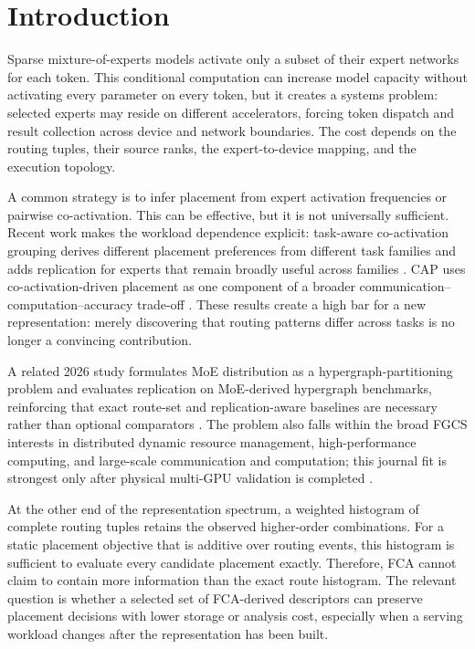 \documentclass[a4paper,preprint,review,12pt,authoryear]{elsarticle}
\begin{document}
\section{Introduction}

Sparse mixture-of-experts models activate only a subset of their expert networks for each token. This conditional computation can increase model capacity without activating every parameter on every token, but it creates a systems problem: selected experts may reside on different accelerators, forcing token dispatch and result collection across device and network boundaries. The cost depends on the routing tuples, their source ranks, the expert-to-device mapping, and the execution topology.

A common strategy is to infer placement from expert activation frequencies or pairwise co-activation. This can be effective, but it is not universally sufficient. Recent work makes the workload dependence explicit: task-aware co-activation grouping derives different placement preferences from different task families and adds replication for experts that remain broadly useful across families \citep{xu2026tacg}. CAP uses co-activation-driven placement as one component of a broader communication--computation--accuracy trade-off \citep{shi2026cap}. These results create a high bar for a new representation: merely discovering that routing patterns differ across tasks is no longer a convincing contribution.

A related 2026 study formulates MoE distribution as a hypergraph-partitioning problem and evaluates replication on MoE-derived hypergraph benchmarks, reinforcing that exact route-set and replication-aware baselines are necessary rather than optional comparators \citep{papp2026replication}. The problem also falls within the broad FGCS interests in distributed dynamic resource management, high-performance computing, and large-scale communication and computation; this journal fit is strongest only after physical multi-GPU validation is completed \citep{fgcs2026scope}.

At the other end of the representation spectrum, a weighted histogram of complete routing tuples retains the observed higher-order combinations. For a static placement objective that is additive over routing events, this histogram is sufficient to evaluate every candidate placement exactly. Therefore, FCA cannot claim to contain more information than the exact route histogram. The relevant question is whether a selected set of FCA-derived descriptors can preserve placement decisions with lower storage or analysis cost, especially when a serving workload changes after the representation has been built.
\end{document}
